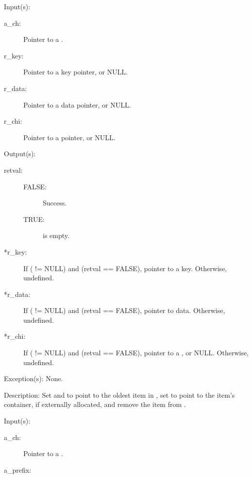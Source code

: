 \begin{capi}
\begin{capilist}
	\item[Input(s): ]
		\begin{description}\item[]
		\item[a\_ch: ]
			Pointer to a .
		\item[r\_key: ]
			Pointer to a key pointer, or NULL.
		\item[r\_data: ]
			Pointer to a data pointer, or NULL.
		\item[r\_chi: ]
			Pointer to a  pointer, or NULL.
		\end{description}
	\item[Output(s): ]
		\begin{description}\item[]
		\item[retval: ]
			\begin{description}\item[]
			\item[FALSE: ]
				Success.
			\item[TRUE: ]
				 is empty.
			\end{description}
		\item[*r\_key: ]
			If ( != NULL) and (retval == FALSE),
			pointer to a key.  Otherwise, undefined.
		\item[*r\_data: ]
			If ( != NULL) and (retval == FALSE),
			pointer to data.  Otherwise, undefined.
		\item[*r\_chi: ]
			If ( != NULL) and (retval == FALSE),
			pointer to a , or NULL.  Otherwise,
			undefined.
		\end{description}
	\item[Exception(s): ] None.
	\item[Description: ]
		Set  and  to point to the oldest
		item in , set  to point to the item's
		container, if externally allocated, and remove the item from
		.
	\end{capilist}
\label{ch_dump}
	\begin{capilist}
	\item[Input(s): ]
		\begin{description}\item[]
		\item[a\_ch: ]
			Pointer to a .
		\item[a\_prefix: ]

\end{description}
\end{capilist}
\end{capi}

